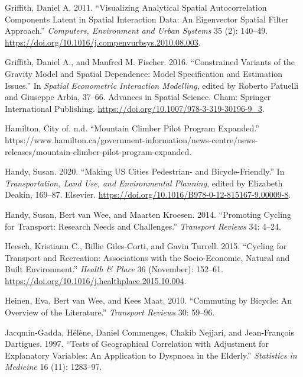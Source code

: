 \documentclass[smallextended]{svjour3}       %
\begin{document}
\leavevmode\hypertarget{ref-Griffith2011}{}%
Griffith, Daniel A. 2011. ``Visualizing Analytical Spatial
Autocorrelation Components Latent in Spatial Interaction Data: An
Eigenvector Spatial Filter Approach.'' \emph{Computers, Environment and
Urban Systems} 35 (2): 140--49.
\url{https://doi.org/10.1016/j.compenvurbsys.2010.08.003}.

\leavevmode\hypertarget{ref-griffithConstrainedVariantsGravity2016}{}%
Griffith, Daniel A., and Manfred M. Fischer. 2016. ``Constrained
Variants of the Gravity Model and Spatial Dependence: Model
Specification and Estimation Issues.'' In \emph{Spatial Econometric
Interaction Modelling}, edited by Roberto Patuelli and Giuseppe Arbia,
37--66. Advances in Spatial Science. Cham: Springer International
Publishing. \url{https://doi.org/10.1007/978-3-319-30196-9_3}.

\leavevmode\hypertarget{ref-Hamilton2019}{}%
Hamilton, City of. n.d. ``Mountain Climber Pilot Program Expanded.''
https://www.hamilton.ca/government-information/news-centre/news-releases/mountain-climber-pilot-program-expanded.

\leavevmode\hypertarget{ref-handyMakingUSCities2020}{}%
Handy, Susan. 2020. ``Making US Cities Pedestrian- and
Bicycle-Friendly.'' In \emph{Transportation, Land Use, and Environmental
Planning}, edited by Elizabeth Deakin, 169--87. Elsevier.
\url{https://doi.org/10.1016/B978-0-12-815167-9.00009-8}.

\leavevmode\hypertarget{ref-handyPromotingCyclingTransport2014}{}%
Handy, Susan, Bert van Wee, and Maarten Kroesen. 2014. ``Promoting
Cycling for Transport: Research Needs and Challenges.'' \emph{Transport
Reviews} 34: 4--24.

\leavevmode\hypertarget{ref-Heesch2015}{}%
Heesch, Kristiann C., Billie Giles-Corti, and Gavin Turrell. 2015.
``Cycling for Transport and Recreation: Associations with the
Socio-Economic, Natural and Built Environment.'' \emph{Health \& Place}
36 (November): 152--61.
\url{https://doi.org/10.1016/j.healthplace.2015.10.004}.

\leavevmode\hypertarget{ref-heinenCommutingBicycleOverview2010}{}%
Heinen, Eva, Bert van Wee, and Kees Maat. 2010. ``Commuting by Bicycle:
An Overview of the Literature.'' \emph{Transport Reviews} 30: 59--96.

\leavevmode\hypertarget{ref-Jacqmin1997}{}%
Jacqmin-Gadda, Hélène, Daniel Commenges, Chakib Nejjari, and
Jean-François Dartigues. 1997. ``Tests of Geographical Correlation with
Adjustment for Explanatory Variables: An Application to Dyspnoea in the
Elderly.'' \emph{Statistics in Medicine} 16 (11): 1283--97.
\end{document}
